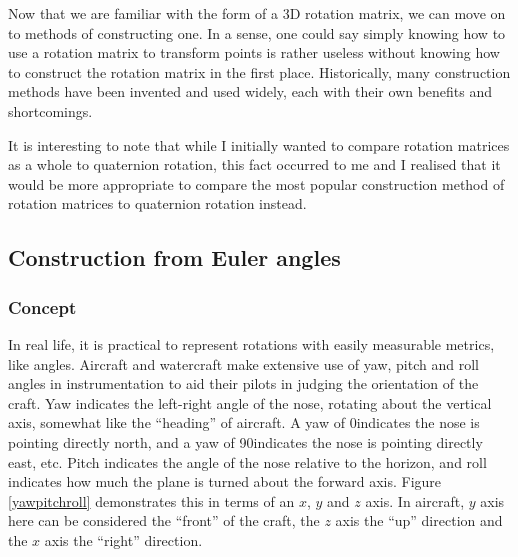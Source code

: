 \documentclass[12pt, a4paper]{article}
\begin{document}
Now that we are familiar with the form of a 3D rotation matrix, we can move on
to methods of constructing one. In a sense, one could say simply knowing how to
use a rotation matrix to transform points is rather useless without knowing how
to construct the rotation matrix in the first place. Historically, many
construction methods have been invented and used widely, each with their own
benefits and shortcomings.

It is interesting to note that while I initially wanted to compare rotation
matrices as a whole to quaternion rotation, this fact occurred to me and I
realised that it would be more appropriate to compare the most popular
construction method of rotation matrices to quaternion rotation instead. 

\subsection{Construction from Euler angles}

\subsubsection{Concept}
In real life, it is practical to represent rotations with easily measurable
metrics, like angles. Aircraft and watercraft make extensive use of yaw, pitch
and roll angles in instrumentation to aid their pilots in judging the
orientation of the craft. Yaw indicates the left-right angle of the nose,
rotating about the vertical axis, somewhat like the ``heading'' of aircraft. A
yaw of 0\textdegree\space indicates the nose is pointing directly north, and a
yaw of 90\textdegree\space indicates the nose is pointing directly east, etc.
Pitch indicates the angle of the nose relative to the horizon, and roll
indicates how much the plane is turned about the forward axis. Figure
\ref{yawpitchroll} demonstrates this in terms of an $x$, $y$ and $z$ axis. In
aircraft, $y$ axis here can be considered the ``front'' of the craft, the $z$
axis the ``up'' direction and the $x$ axis the ``right'' direction. \\
\end{document}
